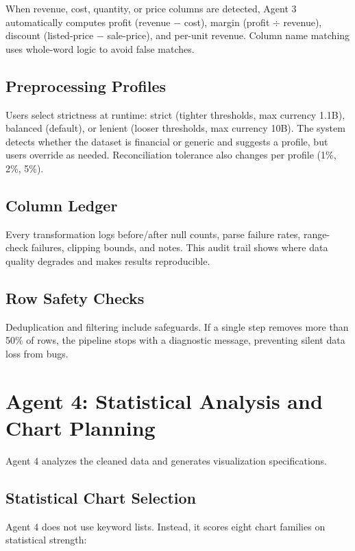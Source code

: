 \documentclass[12pt,a4paper,openany]{report}
\begin{document}
When revenue, cost, quantity, or price columns are detected, Agent 3 automatically computes profit (revenue $-$ cost), margin (profit $\div$ revenue), discount (listed-price $-$ sale-price), and per-unit revenue. Column name matching uses whole-word logic to avoid false matches.

\subsection{Preprocessing Profiles}

Users select strictness at runtime: strict (tighter thresholds, max currency 1.1B), balanced (default), or lenient (looser thresholds, max currency 10B). The system detects whether the dataset is financial or generic and suggests a profile, but users override as needed. Reconciliation tolerance also changes per profile (1\%, 2\%, 5\%).

\subsection{Column Ledger}

Every transformation logs before/after null counts, parse failure rates, range-check failures, clipping bounds, and notes. This audit trail shows where data quality degrades and makes results reproducible.

\subsection{Row Safety Checks}

Deduplication and filtering include safeguards. If a single step removes more than 50\% of rows, the pipeline stops with a diagnostic message, preventing silent data loss from bugs.

\section{Agent 4: Statistical Analysis and Chart Planning}

Agent 4 analyzes the cleaned data and generates visualization specifications.

\subsection{Statistical Chart Selection}

Agent 4 does not use keyword lists. Instead, it scores eight chart families on statistical strength:
\end{document}
